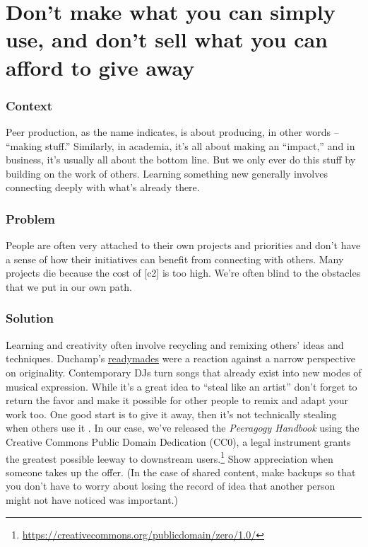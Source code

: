 \begingroup \color{OliveGreen}

\section{Don't make what you can simply use, and don't sell what you can afford to give away} \label{sec:Use_or_make}

\subsubsection*{Context}
Peer production, as the name indicates, is about producing, in other words -- ``making stuff.''  Similarly, in academia, it's all about making an ``impact,'' and in business, it's usually all about the bottom line.  But we only ever do this stuff by building on the work of others.  Learning something new generally involves connecting deeply with what's already there.  

\subsubsection*{Problem}
People are often very attached to their own projects and priorities and don't have a sense of how their initiatives can benefit from connecting with others. Many projects die because the cost of  [c2] is too high.  We're often blind to the obstacles that we put in our own path.

\subsubsection*{Solution} Learning and creativity often involve recycling and remixing others' ideas and techniques.   Duchamp's {\href{https://en.wikipedia.org/w/index.php?title=Readymades_of_Marcel_Duchamp&oldid=660437742}{readymades}} were a reaction against a narrow perspective on originality.  Contemporary DJs turn songs that already exist into new modes of musical expression.  While it's a great idea to ``steal like an artist'' don't forget to return the favor and make it possible for other people to remix and adapt your work too.  One good start is to give it away, then it's not technically stealing when others use it \cite{anderson2009free}. In our case, we've released the \emph{Peeragogy Handbook} using the Creative Commons Public Domain Dedication (CC0), a legal instrument grants the greatest possible leeway to downstream users.\footnote{\url{https://creativecommons.org/publicdomain/zero/1.0/}}  Show appreciation when someone takes up the offer.  (In the case of shared content, make backups so that you don't have to worry about losing the record of idea that another person might not have noticed was important.)

